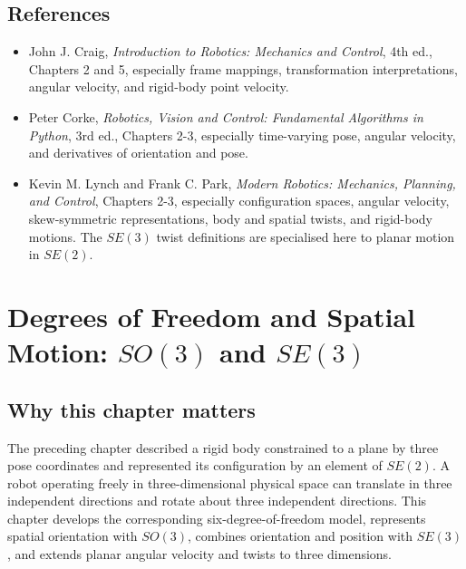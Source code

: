 \documentclass[
  australian,
  12pt,
  letterpaper,
  DIV=11,
  numbers=noendperiod,
  twoside]{scrreprt}
\providecommand{\tightlist}{%
  \setlength{\itemsep}{0pt}\setlength{\parskip}{0pt}}
\begin{document}
\section*{References}\label{references-4}


\begin{itemize}
\tightlist
\item
  John J. Craig, \emph{Introduction to Robotics: Mechanics and Control},
  4th ed., Chapters 2 and 5, especially frame mappings, transformation
  interpretations, angular velocity, and rigid-body point velocity.
\item
  Peter Corke, \emph{Robotics, Vision and Control: Fundamental
  Algorithms in Python}, 3rd ed., Chapters 2-3, especially time-varying
  pose, angular velocity, and derivatives of orientation and pose.
\item
  Kevin M. Lynch and Frank C. Park, \emph{Modern Robotics: Mechanics,
  Planning, and Control}, Chapters 2-3, especially configuration spaces,
  angular velocity, skew-symmetric representations, body and spatial
  twists, and rigid-body motions. The \(SE(3)\) twist definitions are
  specialised here to planar motion in \(SE(2)\).
\end{itemize}

\chapter{\texorpdfstring{Degrees of Freedom and Spatial Motion:
\(SO(3)\) and
\(SE(3)\)}{Degrees of Freedom and Spatial Motion: SO(3) and SE(3)}}\label{sec-spatial-rigid-body-motion}

\section*{Why this chapter matters}\label{why-this-chapter-matters-2}


The preceding chapter described a rigid body constrained to a plane by
three pose coordinates and represented its configuration by an element
of \(SE(2)\). A robot operating freely in three-dimensional physical
space can translate in three independent directions and rotate about
three independent directions. This chapter develops the corresponding
six-degree-of-freedom model, represents spatial orientation with
\(SO(3)\), combines orientation and position with \(SE(3)\), and extends
planar angular velocity and twists to three dimensions.
\end{document}
